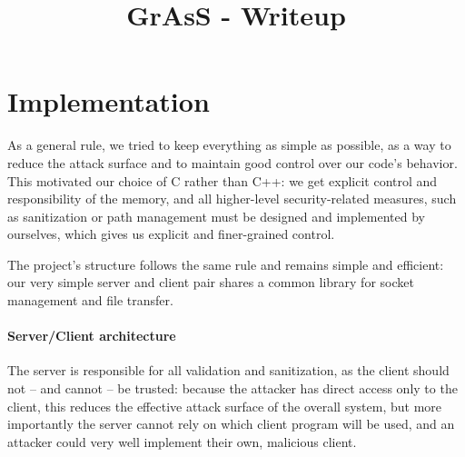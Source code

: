 \documentclass[8pt, oneside, letterpaper]{book}
\title{GrAsS - Writeup}
\date{}
\renewcommand*{\[}{[\![}
\renewcommand*{\]}{]\!]}
\begin{document}
\maketitle

%
%
%
%


\section* {Implementation}
As a general rule, we tried to keep everything as simple as possible, as a way
to reduce the attack surface and to maintain good control over our code's
behavior. This motivated our choice of C rather than C++: we get explicit
control and responsibility of the memory, and all higher-level security-related
measures, such as sanitization or path management must be designed and
implemented by ourselves, which gives us explicit and finer-grained control.

The project's structure follows the same rule and remains simple and efficient:
our very simple server and client pair shares a common library for socket
management and file transfer.

\paragraph {Server/Client architecture}
The server is responsible for all validation and sanitization, as the client
should not -- and cannot -- be trusted: because the attacker has direct access
only to the client, this reduces the effective attack surface of the overall
system, but more importantly the server cannot rely on which client program will
be used, and an attacker could very well implement their own, malicious client.
\end{document}
